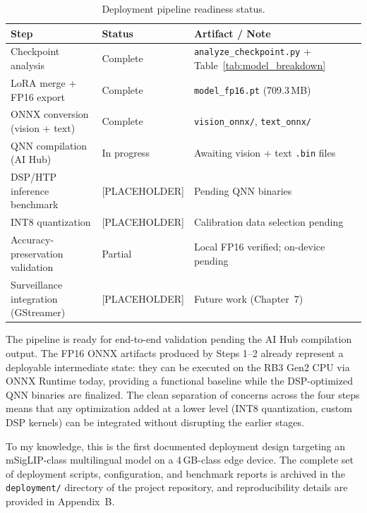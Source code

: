 \documentclass[../main.tex]{subfiles}
\begin{document}
\begin{table}[htbp]
\centering
\caption{Deployment pipeline readiness status.}
\label{tab:deployment_status}
\renewcommand{\arraystretch}{1.3}
\begin{tabularx}{\textwidth}{llX}
\toprule
\textbf{Step} & \textbf{Status} & \textbf{Artifact / Note} \\
\midrule
Checkpoint analysis                   & Complete       & \texttt{analyze\_checkpoint.py} + Table~\ref{tab:model_breakdown} \\
LoRA merge + FP16 export              & Complete       & \texttt{model\_fp16.pt} (709.3\,MB) \\
ONNX conversion (vision + text)       & Complete       & \texttt{vision\_onnx/}, \texttt{text\_onnx/} \\
QNN compilation (AI Hub)              & In progress    & Awaiting vision + text \texttt{.bin} files \\
DSP/HTP inference benchmark           & [PLACEHOLDER]  & Pending QNN binaries \\
INT8 quantization                     & [PLACEHOLDER]  & Calibration data selection pending \\
Accuracy-preservation validation      & Partial        & Local FP16 verified; on-device pending \\
Surveillance integration (GStreamer)  & [PLACEHOLDER]  & Future work (Chapter~7) \\
\bottomrule
\end{tabularx}
\end{table}

\noindent The pipeline is ready for end-to-end validation pending the AI Hub compilation output. The FP16 ONNX artifacts produced by Steps 1--2 already represent a deployable intermediate state: they can be executed on the RB3 Gen2 CPU via ONNX Runtime today, providing a functional baseline while the DSP-optimized QNN binaries are finalized. The clean separation of concerns across the four steps means that any optimization added at a lower level (INT8 quantization, custom DSP kernels) can be integrated without disrupting the earlier stages.

\noindent To my knowledge, this is the first documented deployment design targeting an mSigLIP-class multilingual model on a 4\,GB-class edge device. The complete set of deployment scripts, configuration, and benchmark reports is archived in the \texttt{deployment/} directory of the project repository, and reproducibility details are provided in Appendix~B.
\end{document}

